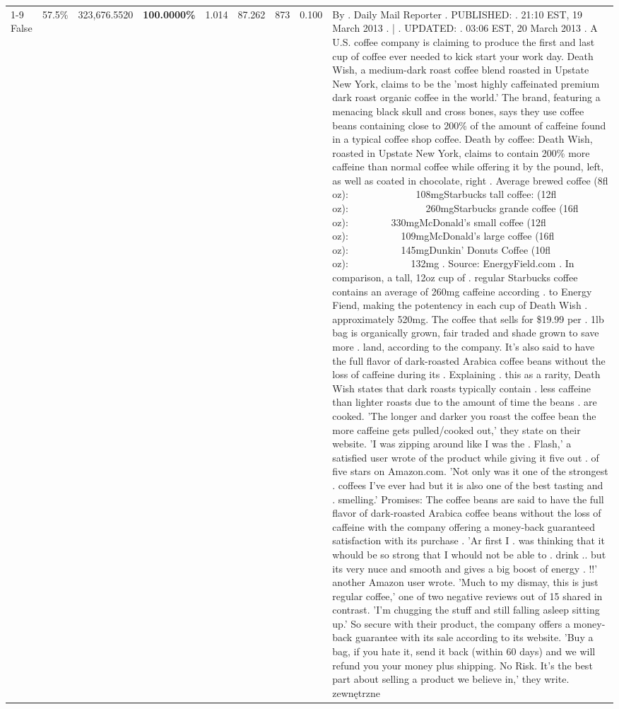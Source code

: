\begin{table}[H]
{\begin{tabular}{lllrlllll}
\cline{1-9} \cline{2-9}
False & 57.5\% & 323,676.5520 & \bfseries \color{red} 100.0000\% & 1.014 & 87.262 & 873 & 0.100 & By . Daily Mail Reporter . PUBLISHED: . 21:10 EST, 19 March 2013 . | . UPDATED: . 03:06 EST, 20 March 2013 . A U.S. coffee company is claiming to produce the first and last cup of coffee ever needed to kick start your work day. Death Wish, a medium-dark roast coffee blend roasted in Upstate New York, claims to be the 'most highly caffeinated premium dark roast organic coffee in the world.' The brand, featuring a menacing black skull and cross bones, says they use coffee beans containing close to 200\% of the amount of caffeine found in a typical coffee shop coffee. Death by coffee: Death Wish, roasted in Upstate New York, claims to contain 200\% more caffeine than normal coffee while offering it by the pound, left, as well as coated in chocolate, right . Average brewed coffee (8fl oz):              108mgStarbucks tall coffee: (12fl oz):                260mgStarbucks grande coffee (16fl oz):         330mgMcDonald's small coffee (12fl oz):           109mgMcDonald's large coffee (16fl oz):           145mgDunkin' Donuts Coffee (10fl oz):             132mg . Source: EnergyField.com . In comparison, a tall, 12oz cup of . regular Starbucks coffee contains an average of 260mg caffeine according . to Energy Fiend, making the potentency in each cup of Death Wish . approximately 520mg. The coffee that sells for \$19.99 per . 1lb bag is organically grown, fair traded and shade grown to save more . land, according to the company. It's also said to have the full flavor of dark-roasted Arabica coffee beans without the loss of caffeine during its . Explaining . this as a rarity, Death Wish states that dark roasts typically contain . less caffeine than lighter roasts due to the amount of time the beans . are cooked. 'The longer and darker you roast the coffee bean the more caffeine gets pulled/cooked out,' they state on their website. 'I was zipping around like I was the . Flash,' a satisfied user wrote of the product while giving it five out . of five stars on Amazon.com. 'Not only was it one of the strongest . coffees I've ever had but it is also one of the best tasting and . smelling.’ Promises: The coffee beans are said to have the full flavor of dark-roasted Arabica coffee beans without the loss of caffeine with the company offering a money-back guaranteed satisfaction with its purchase . 'Ar first I . was thinking that it whould be so strong that I whould not be able to . drink .. but its very nuce and smooth and gives a big boost of energy . !!' another Amazon user wrote. 'Much to my dismay, this is just regular coffee,' one of two negative reviews out of 15 shared in contrast. 'I'm chugging the stuff and still falling asleep sitting up.' So secure with their product, the company offers a money-back guarantee with its sale according to its website. 'Buy a bag, if you hate it, send it back (within 60 days) and we will refund you your money plus shipping. No Risk. It’s the best part about selling a product we believe in,' they write. zewnętrzne \\

\end{tabular}}
\end{table}
